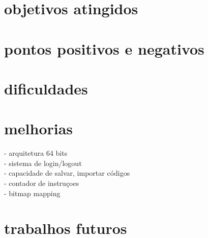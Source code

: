 \section{objetivos atingidos}
\section{pontos positivos e negativos}
\section{dificuldades}
\section{melhorias}
	- arquitetura 64 bits\\
	- sistema de login/logout\\
	- capacidade de salvar, importar códigos\\
	- contador de instruçoes\\
	- bitmap mapping\\
\section{trabalhos futuros}
